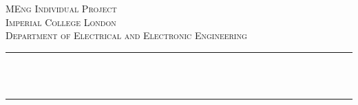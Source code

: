 \begin{titlepage}

    \newcommand{\HRule}{\rule{\linewidth}{0.5mm}} %




    \center %


    \textsc{\LARGE MEng Individual Project}\\[1.5cm] %
    \textsc{\Large Imperial College London}\\[0.5cm] %
    \textsc{\large Department of Electrical and Electronic Engineering}\\[0.5cm] %

    \makeatletter
    \HRule \\[0.4cm]
    { \huge \bfseries \@title}\\[0.4cm] %
    \HRule \\[1.5cm]



\end{titlepage}
